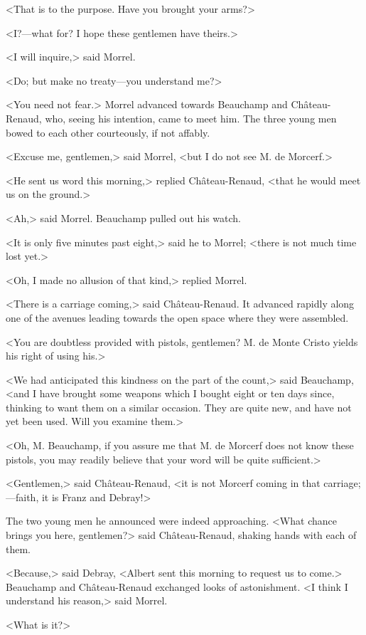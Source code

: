  <That is to the purpose. Have you brought your arms?> 

 <I?—what for? I hope these gentlemen have theirs.> 

 <I will inquire,> said Morrel. 

 <Do; but make no treaty—you understand me?> 

 <You need not fear.> Morrel advanced towards Beauchamp and Château-Renaud, who, seeing his intention, came to meet him. The three young men bowed to each other courteously, if not affably. 

 <Excuse me, gentlemen,> said Morrel, <but I do not see M. de Morcerf.> 

 <He sent us word this morning,> replied Château-Renaud, <that he would meet us on the ground.> 

 <Ah,> said Morrel. Beauchamp pulled out his watch. 

 <It is only five minutes past eight,> said he to Morrel; <there is not much time lost yet.> 

 <Oh, I made no allusion of that kind,> replied Morrel. 

 <There is a carriage coming,> said Château-Renaud. It advanced rapidly along one of the avenues leading towards the open space where they were assembled. 

 <You are doubtless provided with pistols, gentlemen? M. de Monte Cristo yields his right of using his.> 

 <We had anticipated this kindness on the part of the count,> said Beauchamp, <and I have brought some weapons which I bought eight or ten days since, thinking to want them on a similar occasion. They are quite new, and have not yet been used. Will you examine them.> 

 <Oh, M. Beauchamp, if you assure me that M. de Morcerf does not know these pistols, you may readily believe that your word will be quite sufficient.> 

 <Gentlemen,> said Château-Renaud, <it is not Morcerf coming in that carriage;—faith, it is Franz and Debray!> 

 The two young men he announced were indeed approaching. <What chance brings you here, gentlemen?> said Château-Renaud, shaking hands with each of them. 

 <Because,> said Debray, <Albert sent this morning to request us to come.> Beauchamp and Château-Renaud exchanged looks of astonishment. <I think I understand his reason,> said Morrel. 

 <What is it?> 


